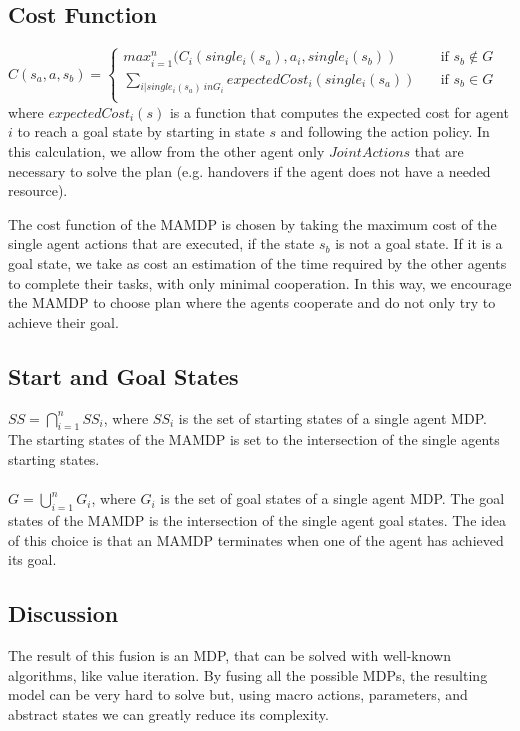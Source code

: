 \subsection{Cost Function}
$C(s_a,a,s_b)= 
	\begin{cases}
		max_{i=1}^{n}(C_i(single_i(s_a),a_i,single_i(s_b))  & \quad \text{if } s_b \not\in G \\
		\sum_{i | single_i(s_a) \ in G_i} expectedCost_i(single_i(s_a))  & \quad \text{if } s_b \in G
		\\
	\end{cases} $	\\

where $expectedCost_i(s)$ is a function that computes the expected cost for agent $i$ to reach a goal state by starting in state $s$ and following the action policy. In this calculation, we allow from the other agent only $JointActions$ that are necessary to solve the plan (e.g. handovers if the agent does not have a needed resource).

The cost function of the MAMDP is chosen by taking the maximum cost of the single agent actions that are executed, if the state $s_b$ is not a goal state. If it is a goal state, we take as cost an estimation of the time required by the other agents to complete their tasks, with only minimal cooperation. In this way, we encourage the MAMDP to choose plan where the agents cooperate and do not only try to achieve their goal.

\subsection{Start and Goal States}
$SS=\bigcap_{i=1}^n SS_i$, where $SS_i$ is the set of starting states of a single agent MDP. The starting states of the MAMDP is set to the intersection of the single agents starting states.\\\\$G=\bigcup_{i=1}^n G_i $, where $G_i$ is the set of goal states of a single agent MDP. The goal states of the MAMDP is the intersection of the single agent goal states. The idea of this choice is that an MAMDP terminates when one of the agent has achieved its goal. 

\subsection{Discussion}
The result of this fusion is an MDP, that can be solved with well-known algorithms, like value iteration. By fusing all the possible MDPs, the resulting model can be  very hard to solve but, using macro actions, parameters, and abstract states we can greatly reduce its complexity. 


